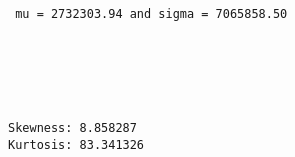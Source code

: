 \documentclass[11pt]{article}
\begin{document}
    \begin{Verbatim}[commandchars=\\\{\}]

 mu = 2732303.94 and sigma = 7065858.50


    \end{Verbatim}

    \begin{center}
    \end{center}
    { \hspace*{\fill} \\}
    
    \begin{center}
    \end{center}
    { \hspace*{\fill} \\}
    
    \begin{Verbatim}[commandchars=\\\{\}]
Skewness: 8.858287
Kurtosis: 83.341326

    \end{Verbatim}
\end{document}
